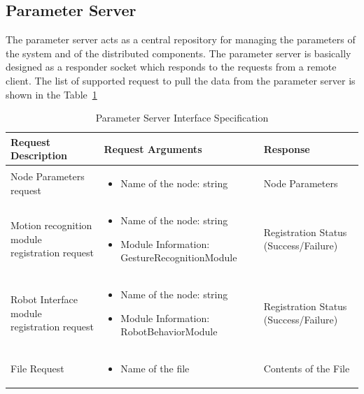 \subsection*{Parameter Server} 
The parameter server acts as a central repository for managing the parameters of the system and of the distributed components. The parameter server is basically designed as a responder socket which responds to the requests from a remote client. The list of supported request to pull the data from the parameter server is shown in the Table~\ref{table:parameter_server}
\begin{table}[H]
\centering
\small
\caption{Parameter Server Interface Specification}
\label{table:parameter_server}
\begin{tabular}{| p{3.3cm} | p{7.4cm} | p{2.8cm} |}
\hline
  \textbf{Request Description} & \textbf{Request Arguments} & \textbf{Response}
  \tabularnewline \hline
  Node Parameters request & \begin{itemize}[leftmargin=*,topsep={0pt},itemsep={0pt},partopsep={0pt},parsep={0pt}] 
                                                  \item Name of the node: string
                                                  \end{itemize} & Node Parameters 
                                          \tabularnewline\hline
                                          
  Motion recognition module registration request &  \begin{itemize}[leftmargin=*,topsep={0pt},itemsep={0pt},partopsep={0pt},parsep={0pt}] 
                                                  \item Name of the node: string
                                                  \item Module Information: GestureRecognitionModule
                                                \end{itemize} & Registration Status  (Success/Failure)
                                          \tabularnewline\hline
  
  Robot Interface module registration request & \begin{itemize}[leftmargin=*,topsep={0pt},itemsep={0pt},partopsep={0pt},parsep={0pt}] 
                                                \item Name of the node: string
                                                \item Module Information: RobotBehaviorModule 
                                            \end{itemize} & Registration Status  (Success/Failure)
                                          \tabularnewline\hline
  File Request & \begin{itemize}[leftmargin=*,topsep={0pt},itemsep={0pt},partopsep={0pt},parsep={0pt}] 
                                                  \item Name of the file
                                                  \end{itemize} & Contents of the File  
  										 \tabularnewline\hline
\end{tabular}
\end{table}

